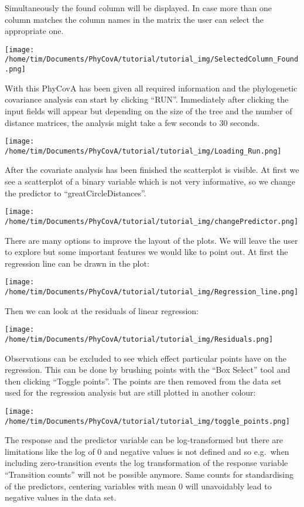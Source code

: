 \documentclass[
]{article}
\begin{document}
Simultaneously the found column will be displayed. In case more than one
column matches the column names in the matrix the user can select the
appropriate one.

\texttt{[image: /home/tim/Documents/PhyCovA/tutorial/tutorial\_img/SelectedColumn\_Found.png]}

With this PhyCovA has been given all required information and the
phylogenetic covariance analysis can start by clicking ``RUN''.
Immediately after clicking the input fields will appear but depending on
the size of the tree and the number of distance matrices, the analysis
might take a few seconds to 30 seconds.

\texttt{[image: /home/tim/Documents/PhyCovA/tutorial/tutorial\_img/Loading\_Run.png]}

After the covariate analysis has been finished the scatterplot is
visible. At first we see a scatterplot of a binary variable which is not
very informative, so we change the predictor to
``greatCircleDistances''.

\texttt{[image: /home/tim/Documents/PhyCovA/tutorial/tutorial\_img/changePredictor.png]}

There are many options to improve the layout of the plots. We will leave
the user to explore but some important features we would like to point
out. At first the regression line can be drawn in the plot:

\texttt{[image: /home/tim/Documents/PhyCovA/tutorial/tutorial\_img/Regression\_line.png]}

Then we can look at the residuals of linear regression:

\texttt{[image: /home/tim/Documents/PhyCovA/tutorial/tutorial\_img/Residuals.png]}

Observations can be excluded to see which effect particular points have
on the regression. This can be done by brushing points with the ``Box
Select'' tool and then clicking ``Toggle points''. The points are then
removed from the data set used for the regression analysis but are still
plotted in another colour:

\texttt{[image: /home/tim/Documents/PhyCovA/tutorial/tutorial\_img/toggle\_points.png]}

The response and the predictor variable can be log-transformed but there
are limitations like the log of 0 and negative values is not defined and
so e.g.~when including zero-transition events the log transformation of
the response variable ``Transition counts'' will not be possible
anymore. Same counts for standardising of the predictors, centering
variables with mean 0 will unavoidably lead to negative values in the
data set.
\end{document}
